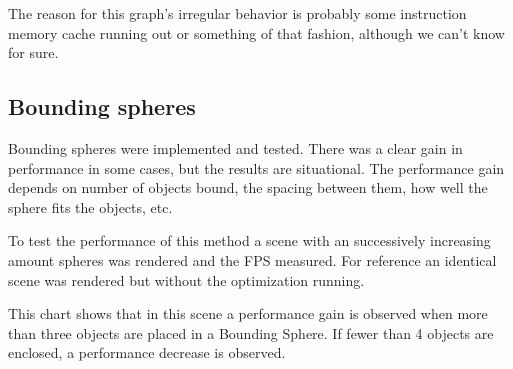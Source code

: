 
			The reason for this graph's irregular behavior is probably some 
			instruction memory cache running out or something of that 
			fashion, although we can't know for sure. 

		\subsection{Bounding spheres}

			Bounding spheres were implemented and tested. There was a clear
			gain in performance in some cases, but the results are situational. 
			The performance gain depends on number of objects bound, the spacing
			between them, how well the sphere fits the objects, etc. 

			To test the performance of this method a scene with an successively 
			increasing amount spheres was rendered and the FPS measured. For 
			reference an identical scene was rendered but without the 
			optimization running.


			This chart shows that in this scene a performance gain is observed 
			when more than three objects are placed in a Bounding Sphere. If
			fewer than 4 objects are enclosed, a performance decrease is 
			observed.